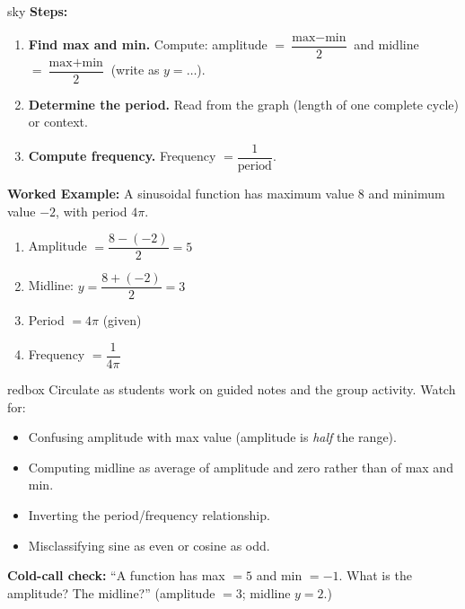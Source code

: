 \documentclass[10pt]{article}
\begin{document}
\begin{skillbox}{sky}
  \textbf{Steps:}
  \begin{enumerate}
    \item \textbf{Find max and min.}  Compute:
          amplitude $= \dfrac{\text{max}-\text{min}}{2}$ \quad and \quad
          midline $= \dfrac{\text{max}+\text{min}}{2}$ (write as $y=\ldots$).
    \item \textbf{Determine the period.}
          Read from the graph (length of one complete cycle) or context.
    \item \textbf{Compute frequency.}  Frequency $= \dfrac{1}{\text{period}}$.
  \end{enumerate}

  \textbf{Worked Example:} A sinusoidal function has maximum value $8$ and minimum
  value $-2$, with period $4\pi$.
  \begin{enumerate}
    \item Amplitude $= \dfrac{8-(-2)}{2} = 5$
    \item Midline: $y = \dfrac{8+(-2)}{2} = 3$
    \item Period $= 4\pi$ (given)
    \item Frequency $= \dfrac{1}{4\pi}$
  \end{enumerate}
\end{skillbox}

\begin{skillbox}{redbox}
  Circulate as students work on guided notes and the group activity.  Watch for:
  \begin{itemize}
    \item Confusing amplitude with max value (amplitude is \textit{half} the range).
    \item Computing midline as average of amplitude and zero rather than of max and min.
    \item Inverting the period/frequency relationship.
    \item Misclassifying sine as even or cosine as odd.
  \end{itemize}

  \textbf{Cold-call check:} ``A function has max $= 5$ and min $= -1$.  What is
  the amplitude?  The midline?'' \quad (amplitude $= 3$; midline $y=2$.)
\end{skillbox}
\end{document}
